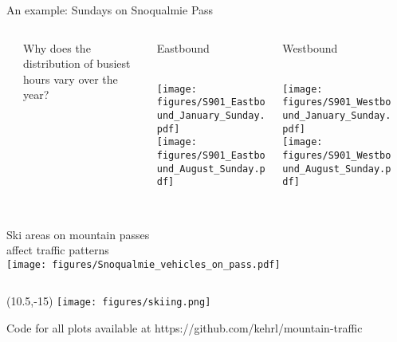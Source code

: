 \documentclass{beamer}
\begin{document}
\begin{frame}[plain]
	\vspace{0.5em} 
	\Large{An example: Sundays on Snoqualmie Pass}
	\vspace{0.9em}
	\begin{columns}
	\begin{column}{0.02\textwidth}
	\end{column}
	\begin{column}{0.36\textwidth}
		\large{Why does the distribution of busiest hours vary over the year?} \\
		\vspace{7em}
	\end{column}
	\begin{column}{0.3\textwidth}
		\large{\centerline{Eastbound}} \\
		\vspace{0.2em}
		\texttt{[image: figures/S901\_Eastbound\_January\_Sunday.pdf]} \\
		\texttt{[image: figures/S901\_Eastbound\_August\_Sunday.pdf]}
	\end{column}
	\begin{column}{0.3\textwidth}
		\large{\centerline{Westbound}} \\
		\vspace{0.2em}
		\texttt{[image: figures/S901\_Westbound\_January\_Sunday.pdf]} \\
		\texttt{[image: figures/S901\_Westbound\_August\_Sunday.pdf]} 
	\end{column}
	\begin{column}{0.02\textwidth}
	\end{column}
	\end{columns}
\end{frame}

\begin{frame}[plain]
	\begin{columns}
	\begin{column}{0.95\textwidth}
	\vspace{0.5em} \\
	\Large{Ski areas on mountain passes \\ affect traffic patterns}  \\
	\vspace{1.5em}
	\texttt{[image: figures/Snoqualmie\_vehicles\_on\_pass.pdf]}
	\end{column}
	\end{columns}
	\begin{textblock}{6}(10.5,-15)
		\texttt{[image: figures/skiing.png]} \\
	\end{textblock}
	\vspace{1em}
	\footnotesize{\centerline{Code for all plots available at https://github.com/kehrl/mountain-traffic}}
\end{frame}
\end{document}
